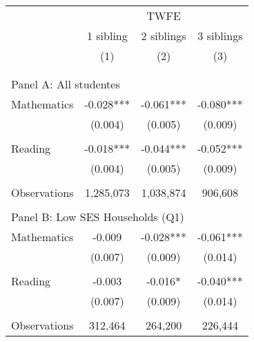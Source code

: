 \makeatletter
{}
{
\makeatother
\begin{tabular}{lccc}
\toprule
\cmidrule(lr){2-4}
& \multicolumn{3}{c}{TWFE} \\
\cmidrule(lr){2-4}
& 1 sibling & 2 siblings & 3 siblings  \\
\cmidrule(lr){2-2} \cmidrule(lr){3-3} \cmidrule(lr){4-4}
& (1) & (2) & (3)\\
\bottomrule
&  &  &  \\
&  &  &   \\
\multicolumn{4}{l}{Panel A: All studentes } \\
Mathematics         &      -0.028***&      -0.061***&      -0.080***\\
                    &     (0.004)   &     (0.005)   &     (0.009)   \\
 
&  &  &   \\
Reading             &      -0.018***&      -0.044***&      -0.052***\\
                    &     (0.004)   &     (0.005)   &     (0.009)   \\
                    &               &               &               \\
Observations        &   1,285,073   &   1,038,874   &     906,608   \\
 
&  &  &   \\
\multicolumn{4}{l}{Panel B: Low SES Households (Q1)} \\
Mathematics         &      -0.009   &      -0.028***&      -0.061***\\
                    &     (0.007)   &     (0.009)   &     (0.014)   \\
 
&  &  &   \\
Reading             &      -0.003   &      -0.016*  &      -0.040***\\
                    &     (0.007)   &     (0.009)   &     (0.014)   \\
                    &               &               &               \\
Observations        &     312,464   &     264,200   &     226,444   \\
 

\end{tabular}}
